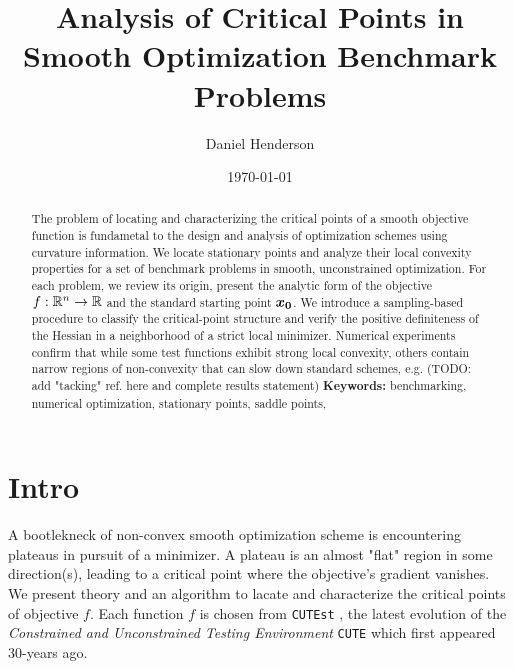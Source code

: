 \documentclass[10pt]{article}
\title{Analysis of Critical Points in Smooth Optimization Benchmark Problems}
\author{Daniel Henderson}
\date{\today}
\begin{document}
\maketitle


\begin{abstract}
    \noindent
    The problem of locating and characterizing the critical points of a
    smooth objective function is fundametal to the design and analysis of
    optimization schemes using curvature information. We locate stationary
    points and analyze their local convexity properties for a set of benchmark
    problems in smooth, unconstrained optimization.
    For each problem, we review its origin, present the analytic form
    of the objective $f:\mathbb{R}^n \to \mathbb{R}$ and the standard starting point
    $\bm{x_0}$.  We introduce a sampling-based procedure to classify
    the critical-point structure and verify the positive definiteness of
    the Hessian in a neighborhood of a strict local minimizer.  Numerical
    experiments confirm that while some test functions exhibit strong
    local convexity, others contain narrow regions of non-convexity that
    can slow down standard schemes, e.g. (TODO: add "tacking" ref. here and complete
    results statement) 
    \noindent\textbf{Keywords:} benchmarking, numerical optimization, stationary points, saddle points,
\end{abstract}



\tableofcontents

\newpage


\section{Intro}
    \label{sec:intro}
    
    \medskip
    
    A bootlekneck of non-convex smooth optimization scheme is encountering plateaus in 
    pursuit of a minimizer. A plateau is an almost "flat" region in some direction(s),
    leading to a critical point where the objective's gradient vanishes. We present theory
    and an algorithm to lacate and characterize the critical points of objective $f$.
    Each function $f$ is chosen from \texttt{CUTEst} \cite{gould2015cutest}, the 
    latest evolution of the \emph{Constrained and Unconstrained Testing Environment} 
    \texttt{CUTE} \cite{bongartz1995cute} which first appeared $30$-years ago. 
    
\end{document}
